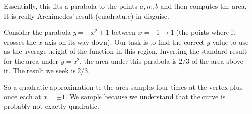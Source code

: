 \documentclass[11pt, oneside]{article}
\begin{document}
Essentially, this fits a parabola to the points $a,m,b$ and then computes the area.  It is really Archimedes' result (quadrature) in disguise.

Consider the parabola $y = -x^2 + 1$ between $x=-1 \rightarrow 1$ (the points where it crosses the $x$-axis on its way down).  Our task is to find the correct $y$-value to use as the average height of the function in this region.  Inverting the standard result for the area under $y=x^2$, the area under this parabola is $2/3$ of the area above it.  The result we seek is $2/3$.

So a quadratic approximation to the area samples four times at the vertex plus once each at $x= \pm 1$.   We sample because we understand that the curve is probably not exactly quadratic.
\end{document}
